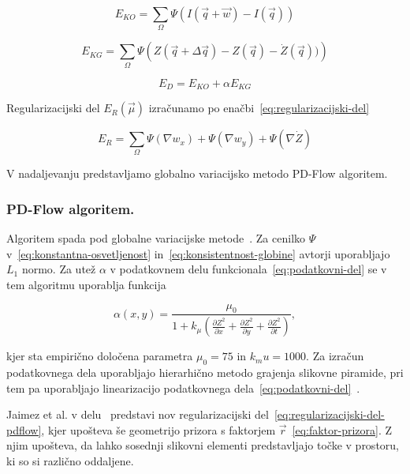 \begin{equation}\label{eq:konstantna-osvetljenost}
	E_{KO} = \sum_\Omega \Psi( I(\vec{q} + \vec{w}) - I(\vec{q}))
\end{equation}

\begin{equation}\label{eq:konsistentnost-globine}
	E_{KG} = \sum_\Omega \Psi\left( Z(\vec{q} + \Delta \vec{q}) - Z(\vec{q}) - \dot{Z}(\vec{q}))\right)
\end{equation}

\begin{equation}\label{eq:podatkovni-del}
	E_D = E_{KO} + \alpha E_{KG}
\end{equation}

Regularizacijski del $E_R(\vec{\mu})$ izračunamo po enačbi~\eqref{eq:regularizacijski-del}

\begin{equation}\label{eq:regularizacijski-del}
	E_R = \sum_\Omega \Psi\left( \nabla w_x \right) + \Psi\left( \nabla w_y \right) + \Psi\left( \nabla \dot{Z} \right)
\end{equation}

V nadaljevanju predstavljamo globalno variacijsko metodo PD-Flow algoritem.


\subsubsection{PD-Flow algoritem.}\label{sec:pd-flow}
Algoritem spada pod globalne variacijske metode~\cite{jaimez2015primal}. Za cenilko $\Psi$ v~\eqref{eq:konstantna-osvetljenost} in~\eqref{eq:konsistentnost-globine} avtorji uporabljajo $L_1$ normo. Za utež $\alpha$ v podatkovnem delu funkcionala~\eqref{eq:podatkovni-del} se v tem algoritmu uporablja funkcija 

\begin{equation}\label{eq:utez}
 \alpha(x,y) = \frac{\mu_0}{1 + k_\mu \left( \frac{\partial Z^2}{\partial x} + \frac{\partial Z^2}{\partial y} + \frac{\partial Z^2}{\partial t} \right)},
\end{equation}

kjer sta empirično določena parametra $\mu_0 = 75$ in $k_mu = 1000$. Za izračun podatkovnega dela uporabljajo hierarhično metodo grajenja slikovne piramide, pri tem pa uporabljajo linearizacijo podatkovnega dela~\eqref{eq:podatkovni-del}~\cite{jaimez2015primal}.

Jaimez et al. v delu~\cite{jaimez2015primal} predstavi nov regularizacijski del~\eqref{eq:regularizacijski-del-pdflow}, kjer upošteva še geometrijo prizora s faktorjem $\vec{r}$~\eqref{eq:faktor-prizora}. Z njim upošteva, da lahko sosednji slikovni elementi predstavljajo točke v prostoru, ki so si različno oddaljene.

